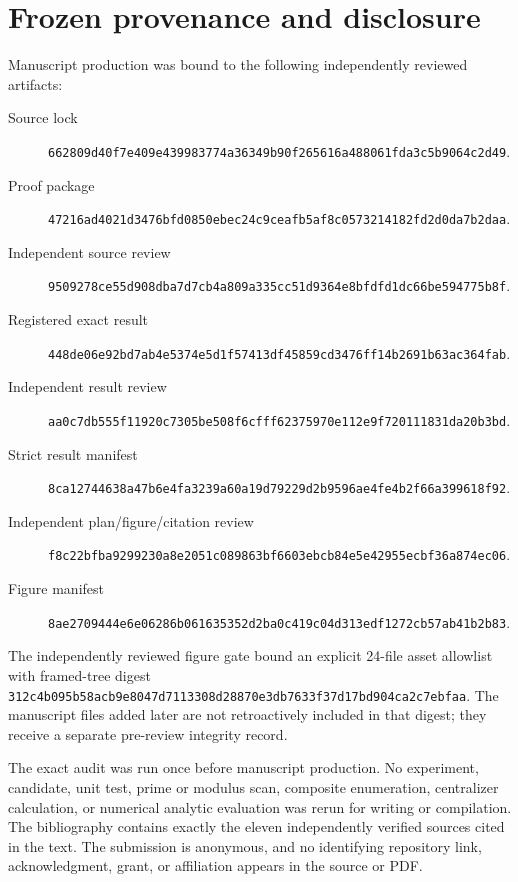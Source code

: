 \documentclass[11pt]{article}
\theoremstyle{definition}
\theoremstyle{remark}
\begin{document}
\section{Frozen provenance and disclosure}
\label{app:provenance}

Manuscript production was bound to the following independently reviewed
artifacts:
\begin{description}
  \item[Source lock]
  \nolinkurl{662809d40f7e409e439983774a36349b90f265616a488061fda3c5b9064c2d49}.
  \item[Proof package]
  \nolinkurl{47216ad4021d3476bfd0850ebec24c9ceafb5af8c0573214182fd2d0da7b2daa}.
  \item[Independent source review]
  \nolinkurl{9509278ce55d908dba7d7cb4a809a335cc51d9364e8bfdfd1dc66be594775b8f}.
  \item[Registered exact result]
  \nolinkurl{448de06e92bd7ab4e5374e5d1f57413df45859cd3476ff14b2691b63ac364fab}.
  \item[Independent result review]
  \nolinkurl{aa0c7db555f11920c7305be508f6cfff62375970e112e9f720111831da20b3bd}.
  \item[Strict result manifest]
  \nolinkurl{8ca12744638a47b6e4fa3239a60a19d79229d2b9596ae4fe4b2f66a399618f92}.
  \item[Independent plan/figure/citation review]
  \nolinkurl{f8c22bfba9299230a8e2051c089863bf6603ebcb84e5e42955ecbf36a874ec06}.
  \item[Figure manifest]
  \nolinkurl{8ae2709444e6e06286b061635352d2ba0c419c04d313edf1272cb57ab41b2b83}.
\end{description}

The independently reviewed figure gate bound an explicit 24-file asset
allowlist with framed-tree digest
\nolinkurl{312c4b095b58acb9e8047d7113308d28870e3db7633f37d17bd904ca2c7ebfaa}.
The manuscript files added later are not retroactively included in that
digest; they receive a separate pre-review integrity record.

The exact audit was run once before manuscript production.  No experiment,
candidate, unit test, prime or modulus scan, composite enumeration,
centralizer calculation, or numerical analytic evaluation was rerun for
writing or compilation.  The bibliography contains exactly the eleven
independently verified sources cited in the text.  The submission is
anonymous, and no identifying repository link, acknowledgment, grant, or
affiliation appears in the source or PDF.



\end{document}
